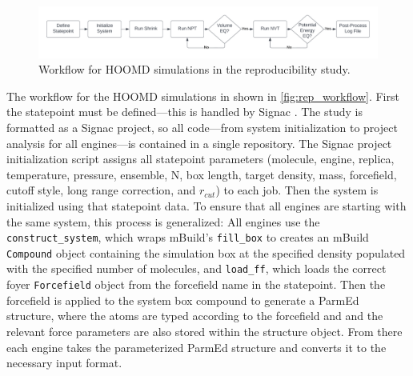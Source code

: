 \begin{figure}[h!]
    \centering
    \includegraphics[width=\linewidth,keepaspectratio]{figures/rep_study/reproducibility_workflow.png}
    \caption{Workflow for HOOMD simulations in the reproducibility study.}\label{fig:rep_workflow}
\end{figure}
The workflow for the HOOMD simulations in shown in \autoref{fig:rep_workflow}. 
First the statepoint must be defined---this is handled by Signac \cite{Adorf2018, signac_zenodo, signac_scipy_2018, signac_scipy_2021}. 
The study is formatted as a Signac project, so all code---from system initialization to project analysis for all engines---is contained in a single repository.
The Signac project initialization script assigns all statepoint parameters (molecule, engine, replica, temperature, pressure, ensemble, N, box length, target density, mass, forcefield, cutoff style, long range correction, and $r_{cut}$) to each job. 
Then the system is initialized using that statepoint data. 
To ensure that all engines are starting with the same system, this process is generalized: All engines use the \lstinline{construct_system}, which wraps mBuild's \lstinline{fill_box} to creates an mBuild \lstinline{Compound} object containing the simulation box at the specified density populated with the specified number of molecules, and \lstinline{load_ff}, which loads the correct foyer \lstinline{Forcefield} object from the forcefield name in the statepoint. 
Then the forcefield is applied to the system box compound to generate a ParmEd structure\cite{Shirts2017}, where the atoms are typed according to the forcefield and and the relevant force parameters are also stored within the structure object. 
From there each engine takes the parameterized ParmEd structure and converts it to the necessary input format. 

